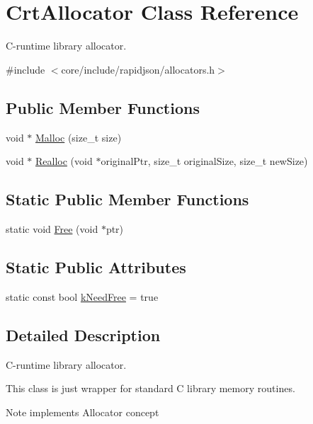 \hypertarget{classCrtAllocator}{}\section{Crt\+Allocator Class Reference}
\label{classCrtAllocator}


C-\/runtime library allocator.  




{\ttfamily \#include $<$core/include/rapidjson/allocators.\+h$>$}

\subsection*{Public Member Functions}
\begin{DoxyCompactItemize}
\item 
void $\ast$ \hyperlink{classCrtAllocator_acd720631f8c094041afa6c7951f0d935}{Malloc} (size\+\_\+t size)
\item 
void $\ast$ \hyperlink{classCrtAllocator_a646bb6f68afe773a62a22f7f14f83e97}{Realloc} (void $\ast$original\+Ptr, size\+\_\+t original\+Size, size\+\_\+t new\+Size)
\end{DoxyCompactItemize}
\subsection*{Static Public Member Functions}
\begin{DoxyCompactItemize}
\item 
static void \hyperlink{classCrtAllocator_a5043907058d906dcb1291e9491560373}{Free} (void $\ast$ptr)
\end{DoxyCompactItemize}
\subsection*{Static Public Attributes}
\begin{DoxyCompactItemize}
\item 
static const bool \hyperlink{classCrtAllocator_ac7df8398c529290f0cd5950d9492f524}{k\+Need\+Free} = true
\end{DoxyCompactItemize}


\subsection{Detailed Description}
C-\/runtime library allocator. 

This class is just wrapper for standard C library memory routines. \begin{DoxyNote}{Note}
implements Allocator concept 
\end{DoxyNote}



